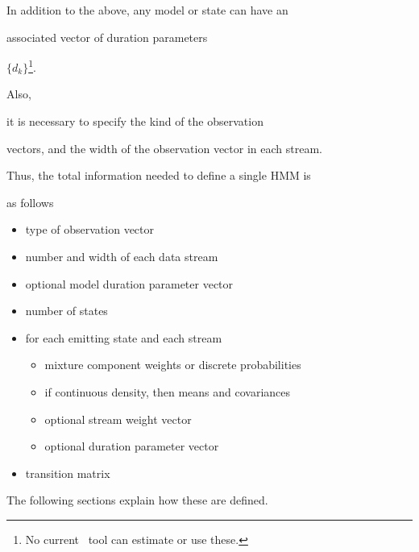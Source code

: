 In addition to the above, any model or state can have an


associated vector of duration parameters


 $\{d_k\}$\footnote{


No current \HTK\ tool can estimate or use these.


}.  


Also,


it is necessary to specify the kind of the observation


vectors, and the width of the observation vector in each stream.


Thus, the total information needed to define a single HMM is 


as follows


   \begin{itemize}


    \item type of observation vector


    \item number and width of each data stream


    \item optional model duration parameter vector


    \item number of states


    \item for each emitting state and each stream


        \begin{itemize}


           \item mixture component weights or discrete probabilities


           \item if continuous density, then means and covariances


           \item optional stream weight vector    


           \item optional duration parameter vector


         \end{itemize}  


    \item transition matrix


\end{itemize}


The following sections explain how these are defined.





